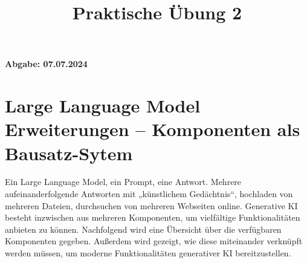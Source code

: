 \documentclass[12pt,ngerman]{AssignmentClass}
\title{Praktische Übung 2} %
\begin{document}
	\maketitle

    \noindent %
    \begin{tcolorbox}[colback=gray!20, %
                      colframe=gray!20, %
                      boxrule=0pt, %
                      sharp corners, %
                      valign=center, %
                      halign=center, %
                      height=2cm] %
    \LARGE \bfseries Abgabe: 07.07.2024 %
    \end{tcolorbox}

    
\section{Large Language Model Erweiterungen – Komponenten als Bausatz-Sytem}
    
Ein Large Language Model, ein Prompt, eine Antwort. Mehrere aufeinanderfolgende Antworten mit „künstlichem Gedächtnis“, hochladen von mehreren Dateien, durchsuchen von mehreren Webseiten online. Generative KI besteht inzwischen aus mehreren Komponenten, um vielfältige Funktionalitäten anbieten zu können. Nachfolgend wird eine Übersicht über die verfügbaren Komponenten gegeben. Außerdem wird gezeigt, wie diese miteinander verknüpft werden müssen, um moderne Funktionalitäten generativer KI bereitzustellen. 
        
\end{document}

